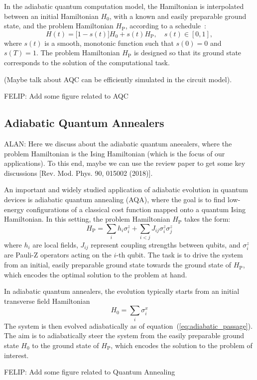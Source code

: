 In the adiabatic quantum computation model, the Hamiltonian is interpolated between an
initial Hamiltonian $H_0$, with a known and easily preparable ground state, and the problem
Hamiltonian $H_\mathrm{P}$, according to a schedule~\cite{albash_adiabatic_2018}:
\begin{equation}
    H(t) = \big[1 - s(t)\big] H_0 + s(t) H_\mathrm{P}, \quad s(t) \in [0,1],
    \label{eq:adiabatic_passage}
\end{equation}
where $s(t)$ is a smooth, monotonic function such that $s(0)=0$ and $s(T)=1$. The problem
Hamiltonian $H_\mathrm{P}$ is designed so that its ground state corresponds to the solution
of the computational task.

(Maybe talk about AQC can be efficiently simulated in the circuit model).

{\color{red} FELIP: Add some figure related to AQC}

\subsection{Adiabatic Quantum Annealers}

{\color{blue}ALAN: Here we discuss about the adiabatic quantum aneealers, where the problem Hamiltonian
is the Ising Hamiltonian (which is the focus of our applications). To this end, maybe we can use the
review paper to get some key discussions [Rev. Mod. Phys. 90, 015002 (2018)].}

An important and widely studied application of adiabatic evolution in quantum
devices is adiabatic quantum annealing (AQA), where the goal is to find low-energy configurations of
a classical cost function mapped onto a quantum Ising Hamiltonian. In this setting, the problem
Hamiltonian $H_\mathrm{P}$ takes the form:
\begin{equation}
    H_\mathrm{P} = \sum_i h_i \sigma_i^z + \sum_{i<j} J_{ij} \sigma_i^z \sigma_j^z
    \label{eq:ising_hamiltonian}
\end{equation}
where $h_i$ are local fields, $J_{ij}$ represent coupling strengths between qubits, and
$\sigma_i^z$ are Pauli-Z operators acting on the $i$-th qubit. The task is to drive the system
from an initial, easily preparable ground state towards the ground state of $H_\mathrm{P}$,
which encodes the optimal solution to the problem at hand.

In adiabatic quantum annealers, the evolution typically starts from an initial transverse
field Hamiltonian 
\begin{equation}
    H_0 = \sum_i \sigma_i^x
    \label{eq:transverse_field_hamiltonian}
\end{equation}
The system is then evolved adiabatically as of equation~(\ref{eq:adiabatic_passage}). The aim
is to adiabatically steer the system from the easily preparable ground state $H_0$ to the
ground state of $H_\mathrm{P}$, which encodes the solution to the problem of interest.

{\color{red} FELIP: Add some figure related to Quantum Annealing}